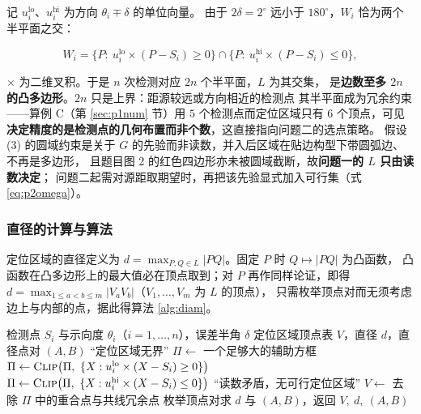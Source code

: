 \documentclass[withoutpreface, bwprint]{cumcmthesis}
\begin{document}
记 $u_i^{\mathrm{lo}}$、$u_i^{\mathrm{hi}}$ 为方向 $\theta_i\mp\delta$ 的单位向量。
由于 $2\delta=2^\circ$ 远小于 $180^\circ$，$W_i$ 恰为两个半平面之交：

\begin{equation}
  \label{eq:halfplane}
  W_i=\bigl\{P:\ u_i^{\mathrm{lo}}\times(P-S_i)\ge 0\bigr\}\cap
      \bigl\{P:\ u_i^{\mathrm{hi}}\times(P-S_i)\le 0\bigr\},
\end{equation}

$\times$ 为二维叉积。于是 $n$ 次检测对应 $2n$ 个半平面，$L$ 为其交集，
是\textbf{边数至多 $2n$ 的凸多边形}。$2n$ 只是上界：距源较远或方向相近的检测点
其半平面成为冗余约束——算例 C（第 \ref{sec:p1num} 节）用 $5$ 个检测点而定位区域只有
$6$ 个顶点，可见\textbf{决定精度的是检测点的几何布置而非个数}，这直接指向问题二的选点策略。
假设 (3) 的圆域约束是关于 $G$ 的先验而非读数，并入后区域在贴边构型下带圆弧边、不再是多边形，
且题目图 2 的红色四边形亦未被圆域截断，故\textbf{问题一的 $L$ 只由读数决定}；
问题二起需对源距取期望时，再把该先验显式加入可行集（式 \eqref{eq:p2omega}）。

\subsubsection{直径的计算与算法}

定位区域的直径定义为 $d=\max_{P,Q\in L}|PQ|$。固定 $P$ 时 $Q\mapsto|PQ|$ 为凸函数，
凸函数在凸多边形上的最大值必在顶点取到；对 $P$ 再作同样论证，即得
$d=\max_{1\le a<b\le m}\lvert V_aV_b\rvert$（$V_1,\ldots,V_m$ 为 $L$ 的顶点），
只需枚举顶点对而无须考虑边上与内部的点，据此得算法 \ref{alg:diam}。

\begin{algorithm}[H]
\caption{定位区域与直径的计算}
\label{alg:diam}
\begin{algorithmic}[1]
\Require 检测点 $S_i$ 与示向度 $\theta_i$（$i=1,\ldots,n$），误差半角 $\delta$
\Ensure 定位区域顶点表 $V$，直径 $d$，直径点对 $(A,B)$
  \State \Return “定位区域无界” 
\EndIf
\State $\Pi\leftarrow$ 一个足够大的辅助方框 
  \State $\Pi\leftarrow\textsc{Clip}\bigl(\Pi,\ \{X: u_i^{\mathrm{lo}}\times(X-S_i)\ge 0\}\bigr)$
  \State $\Pi\leftarrow\textsc{Clip}\bigl(\Pi,\ \{X: u_i^{\mathrm{hi}}\times(X-S_i)\le 0\}\bigr)$
  \If{$\Pi=\varnothing$} \State \Return “读数矛盾，无可行定位区域” \EndIf
\EndFor
\State $V\leftarrow$ 去除 $\Pi$ 中的重合点与共线冗余点
\State 枚举顶点对求 $d$ 与 $(A,B)$，返回 $V,\ d,\ (A,B)$
\end{algorithmic}
\end{algorithm}
\end{document}
